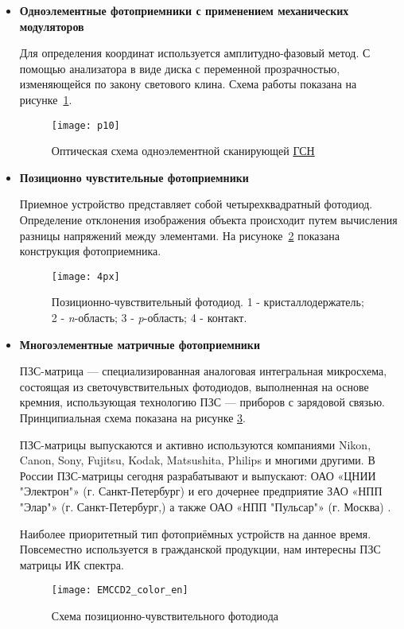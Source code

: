 \begin{itemize}
	\item \textbf{Одноэлементные фотоприемники с применением механических модуляторов}
	
	Для определения координат используется амплитудно-фазовый метод. С помощью анализатора в виде диска с переменной прозрачностью, изменяющейся по закону светового клина. \cite[]{bibook1} Схема работы показана на рисунке~\ref{fig:p10}.
	
	\begin{figure}[ht]
		\centering
		\texttt{[image: p10]} 
		\caption{Оптическая схема одноэлементной сканирующей \hyperref[acroGSN]{ГСН} }
		\label{fig:p10}
	\end{figure}

	\item \textbf{Позиционно чувстительные фотоприемники}
	
	Приемное устройство представляет собой четырехквадратный фотодиод. Определение отклонения изображения объекта происходит путем вычисления разницы напряжений между элементами. На рисуноке~\ref{fig:4px} показана конструкция фотоприемника.
\newpage	
	\begin{figure}[ht]
		\centering
		\texttt{[image: 4px]} 
		\caption{Позиционно-чувствительный фотодиод. 1 - кристаллодержатель; 2 - \textit{n}-область; 3 - \textit{p}-область; 4 - контакт.}
		\label{fig:4px}
	\end{figure}
	


	\item \textbf{Многоэлементные матричные фотоприемники}
	
	ПЗС-матрица — специализированная аналоговая интегральная микросхема, состоящая из светочувствительных фотодиодов, выполненная на основе кремния, использующая технологию ПЗС — приборов с зарядовой связью. Принципиальная схема показана на рисунке \ref{fig:EMCCD2_color_en}.
	
	ПЗС-матрицы выпускаются и активно используются компаниями Nikon, Canon, Sony, Fujitsu, Kodak, Matsushita, Philips и многими другими. В России ПЗС-матрицы сегодня разрабатывают и выпускают: ОАО «ЦНИИ "Электрон"» (г. Санкт-Петербург) и его дочернее предприятие ЗАО «НПП "Элар"» (г. Санкт-Петербург,) а также ОАО «НПП "Пульсар"» (г. Москва) \cite[]{CCD}.
	
	Наиболее приоритетный тип фотоприёмных устройств на данное время. Повсеместно используется в гражданской продукции, нам интересны ПЗС матрицы ИК спектра.
	
	\begin{figure}[ht]
		\centering
		\texttt{[image: EMCCD2\_color\_en]} 
		\caption{Схема позиционно-чувствительного фотодиода \cite[]{CCD2}}
		\label{fig:EMCCD2_color_en}
	\end{figure}
	
\end{itemize}

